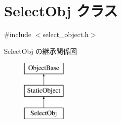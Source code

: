 \hypertarget{class_select_obj}{}\section{Select\+Obj クラス}
\label{class_select_obj}


{\ttfamily \#include $<$select\+\_\+object.\+h$>$}

Select\+Obj の継承関係図\begin{figure}[H]
\begin{center}
\leavevmode
\includegraphics[height=3.000000cm]{class_select_obj}
\end{center}
\end{figure}
